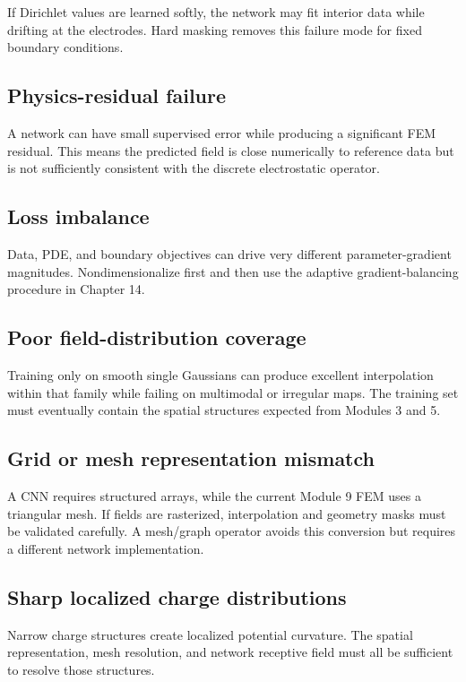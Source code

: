 \documentclass[11pt]{article}
\begin{document}
If Dirichlet values are learned softly, the network may fit interior data while drifting at the electrodes. Hard masking removes this failure mode for fixed boundary conditions.

\subsection{Physics-residual failure}

A network can have small supervised error while producing a significant FEM residual. This means the predicted field is close numerically to reference data but is not sufficiently consistent with the discrete electrostatic operator.

\subsection{Loss imbalance}

Data, PDE, and boundary objectives can drive very different parameter-gradient magnitudes. Nondimensionalize first and then use the adaptive gradient-balancing procedure in Chapter 14.

\subsection{Poor field-distribution coverage}

Training only on smooth single Gaussians can produce excellent interpolation within that family while failing on multimodal or irregular maps. The training set must eventually contain the spatial structures expected from Modules 3 and 5.

\subsection{Grid or mesh representation mismatch}

A CNN requires structured arrays, while the current Module 9 FEM uses a triangular mesh. If fields are rasterized, interpolation and geometry masks must be validated carefully. A mesh/graph operator avoids this conversion but requires a different network implementation.

\subsection{Sharp localized charge distributions}

Narrow charge structures create localized potential curvature. The spatial representation, mesh resolution, and network receptive field must all be sufficient to resolve those structures.
\end{document}
